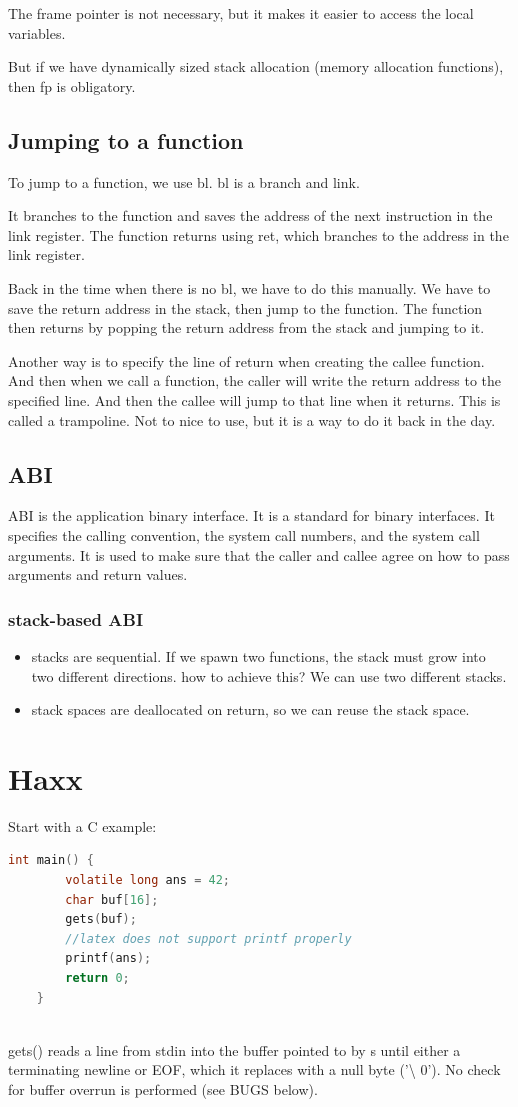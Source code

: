 \documentclass[letterpaper,12pt]{article}
\begin{document}
The frame pointer is not necessary, but it makes it easier to access the local
variables.

But if we have dynamically sized stack allocation (memory allocation
functions), then fp is obligatory.

\subsection{Jumping to a function}
To jump to a function, we use bl. bl is a branch and link.

It branches to the function and saves the address of the next instruction in
the link register. The function returns using ret, which branches to the
address in the link register.

Back in the time when there is no bl, we have to do this manually. We have to
save the return address in the stack, then jump to the function. The function
then returns by popping the return address from the stack and jumping to it.

Another way is to specify the line of return when creating the callee function.
And then when we call a function, the caller will write the return address to
the specified line. And then the callee will jump to that line when it returns.
This is called a trampoline. Not to nice to use, but it is a way to do it back
in the day.

\subsection{ABI}
ABI is the application binary interface. It is a standard for binary
interfaces. It specifies the calling convention, the system call numbers, and
the system call arguments. It is used to make sure that the caller and callee
agree on how to pass arguments and return values.

\subsubsection{stack-based ABI}
\begin{itemize}
    \item stacks are sequential. If we spawn two functions, the stack must grow into two
          different directions. how to achieve this? We can use two different stacks.
    \item stack spaces are deallocated on return, so we can reuse the stack space.
\end{itemize}
\section{Haxx}
Start with a C example: \begin{lstlisting}[language=C]
    int main() {
        volatile long ans = 42;
        char buf[16];
        gets(buf);
        //latex does not support printf properly
        printf(ans);
        return 0;
    }
    
\end{lstlisting}
gets() reads a line from stdin into the buffer pointed to by s until either a
terminating newline or EOF, which it replaces with a null byte ('\textbackslash
0'). No check for buffer overrun is performed (see BUGS below).
\end{document}
